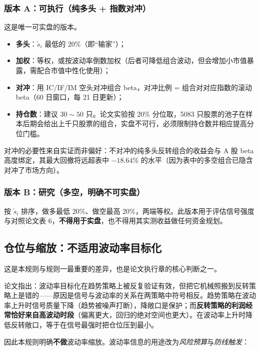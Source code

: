 \subsubsection*{版本 A：可执行（纯多头 + 指数对冲）}

这是唯一可实盘的版本。

\begin{itemize}[leftmargin=2.2em]
  \item \textbf{多头}：$\tilde s_i$ 最低的 20\%（即“输家”）；
  \item \textbf{加权}：等权，或按波动率倒数加权（后者可降低组合波动，但会增加小市值暴露，需配合市值中性化使用）；
  \item \textbf{对冲}：用 IC/IF/IM 空头对冲组合 beta，对冲比例 = 组合对对应指数的滚动 beta（60 日窗口，每 21 日更新）；
  \item \textbf{持仓数}：建议 $30\sim50$ 只。论文实验按 20\% 分位取，5083 只股票的池子在样本后期会给出上千只股票的组合，实盘不可行，必须限制持仓数并相应提高分位门槛。
\end{itemize}

对冲的必要性来自实证而非偏好：不对冲的纯多头反转组合的收益会与 A 股 beta 高度绑定，其最大回撤将远超表中 $-18.64\%$ 的水平（因为表中的多空组合已隐含对冲了市场方向）。

\subsubsection*{版本 B：研究（多空，明确不可实盘）}

按 $\tilde s_i$ 排序，做多最低 20\%、做空最高 20\%，两端等权。此版本用于评估信号强度与对照论文表 6，\textbf{不得用于实盘}，也不得用其实测收益做任何资金规划。

\subsection{仓位与缩放：不适用波动率目标化}

这是本规则与规则一最重要的差异，也是论文执行章的核心判断之一。

论文指出：波动率目标化在趋势策略上被反复验证有效，但把它机械照搬到反转策略上是错的——原因是信号与波动率的关系在两策略中符号相反。趋势策略在波动率上升时信号质量下降（趋势被噪声打断），降敞口是保护；而\textbf{反转策略的利润经常恰好来自高波动时段}（偏离更大，回归的绝对空间也更大）。在波动率上升时降低反转敞口，等于在信号最强时把仓位压到最小。

因此本规则明确\textbf{不做}波动率缩放。波动率信息的用途改为\emph{风险预算}与\emph{防线触发}：

